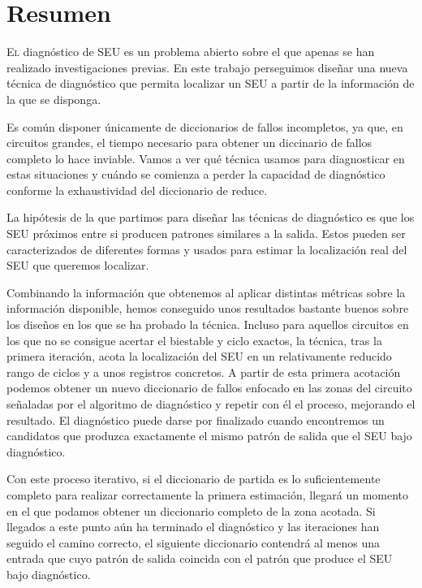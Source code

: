 \chapter*{Resumen}
\pagestyle{especial}
{}

\lettrine[lraise=-0.1, lines=2, loversize=0.2]{E}{l} diagnóstico de \gls{SEU} es
un problema abierto sobre el que apenas se han realizado investigaciones previas.
En este trabajo perseguimos diseñar una nueva técnica de diagnóstico que permita
localizar un \gls{SEU} a partir de la información de la que se disponga.

Es común disponer únicamente de diccionarios de fallos incompletos, ya que, en
circuitos grandes, el tiempo necesario para obtener un diccinario de fallos
completo lo hace inviable. Vamos a ver qué técnica usamos para diagnosticar en
estas situaciones y cuándo se comienza a perder la capacidad de diagnóstico
conforme la exhaustividad del diccionario de reduce.

La hipótesis de la que partimos para diseñar las técnicas de diagnóstico es que
los \gls{SEU} próximos entre si producen patrones similares a la salida. Estos
pueden ser caracterizados de diferentes formas y usados para estimar la
localización real del \gls{SEU} que queremos localizar.

Combinando la información que obtenemos al aplicar distintas métricas sobre la
información disponible, hemos conseguido unos resultados bastante buenos sobre los
diseños en los que se ha probado la técnica. Incluso para aquellos circuitos en
los que no se consigue acertar el biestable y ciclo exactos, la técnica, tras la
primera iteración, acota la localización del \gls{SEU} en un relativamente 
reducido rango de ciclos y a unos registros concretos. A partir de esta primera
acotación podemos obtener un nuevo diccionario de fallos enfocado en las zonas del
circuito señaladas por el algoritmo de diagnóstico y repetir con él el proceso,
mejorando el resultado. El diagnóstico puede darse por finalizado cuando
encontremos un candidatos que produzca exactamente el mismo patrón de salida que
el \gls{SEU} bajo diagnóstico.

Con este proceso iterativo, si el diccionario de partida es lo suficientemente
completo para realizar correctamente la primera estimación, llegará un momento en
el que podamos obtener un diccionario completo de la zona acotada. Si llegados a
este punto aún ha terminado el diagnóstico y las iteraciones han seguido el camino
correcto, el siguiente diccionario contendrá al menos una entrada que cuyo patrón
de salida coincida con el patrón que produce el \gls{SEU} bajo diagnóstico.

